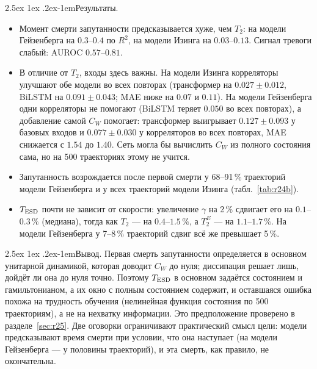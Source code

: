 \documentclass[12pt,a4paper]{report}
\makeatletter
\renewcommand\paragraph{\@startsection{paragraph}{4}{\z@}%
  {2.5ex \@plus1ex \@minus.2ex}{-1em}{\normalfont\normalsize\bfseries}}
\numberwithin{equation}{chapter}
\makeatother
\begin{document}
\paragraph{Результаты.}
\begin{itemize}
\item Момент смерти запутанности предсказывается хуже, чем $T_2$: на
      модели Гейзенберга на $0.3$--$0.4$ по $R^2$, на модели Изинга на
      $0.03$--$0.13$. Сигнал тревоги слабый: AUROC $0.57$--$0.81$.
\item В отличие от $T_2$, входы здесь важны. На модели Изинга корреляторы
      улучшают обе модели во всех повторах (трансформер на
      $0.027\pm0.012$, BiLSTM на $0.091\pm0.043$; MAE ниже на $0.07$ и
      $0.11$). На модели Гейзенберга одни корреляторы не помогают (BiLSTM
      теряет $0.050$ во всех повторах), а добавление самой $C_W$ помогает:
      трансформер выигрывает $0.127\pm0.093$ у базовых входов и
      $0.077\pm0.030$ у корреляторов во всех повторах, MAE снижается с
      $1.54$ до $1.40$. Сеть могла бы вычислить $C_W$ из полного состояния
      сама, но на 500 траекториях этому не учится.
\item Запутанность возрождается после первой смерти у 68--91\,\% траекторий
      модели Гейзенберга и у всех траекторий модели Изинга
      (табл.~\ref{tab:r24b}).
\item $T_{\rm ESD}$ почти не зависит от скорости: увеличение $\gamma$ на
      2\,\% сдвигает его на $0.1$--$0.3\,\%$ (медиана), тогда как $T_2$ --- на
      $0.4$--$1.5\,\%$, а $T_2^E$ --- на $1.1$--$1.7\,\%$. На модели
      Гейзенберга у 7--8\,\% траекторий сдвиг всё же превышает 5\,\%.
\end{itemize}

\paragraph{Вывод.} Первая смерть запутанности определяется в основном
унитарной динамикой, которая доводит $C_W$ до нуля; диссипация решает лишь,
дойдёт ли она до нуля точно. Поэтому $T_{\rm ESD}$ в основном задаётся
состоянием и гамильтонианом, а их окно с полным состоянием содержит, и
оставшаяся ошибка похожа на трудность обучения (нелинейная функция
состояния по 500 траекториям), а не на нехватку информации. Это
предположение проверено в разделе~\ref{sec:r25}. Две оговорки ограничивают
практический смысл цели: модели предсказывают время смерти при условии,
что она наступает (на модели Гейзенберга --- у половины траекторий), и эта
смерть, как правило, не окончательна.
\end{document}
